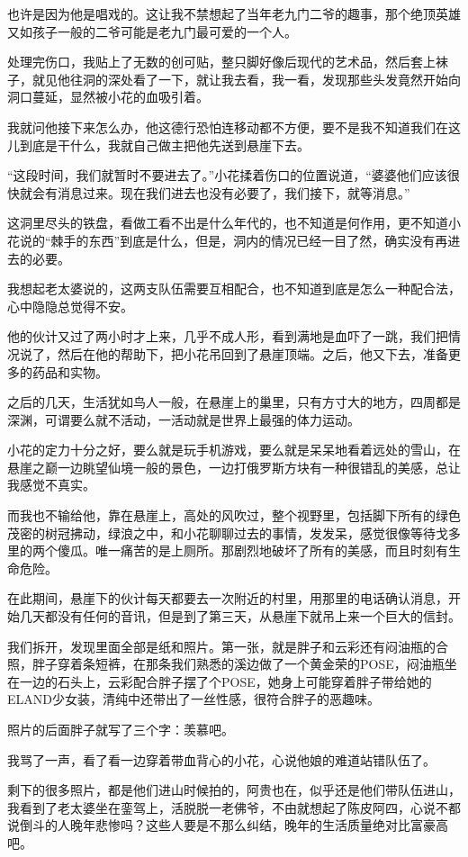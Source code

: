 也许是因为他是唱戏的。这让我不禁想起了当年老九门二爷的趣事，那个绝顶英雄又如孩子一般的二爷可能是老九门最可爱的一个人。

处理完伤口，我贴上了无数的创可贴，整只脚好像后现代的艺术品，然后套上袜子，就见他往洞的深处看了一下，就让我去看，我一看，发现那些头发竟然开始向洞口蔓延，显然被小花的血吸引着。

我就问他接下来怎么办，他这德行恐怕连移动都不方便，要不是我不知道我们在这儿到底是干什么，我就自己做主把他先送到悬崖下去。

“这段时间，我们就暂时不要进去了。”小花揉着伤口的位置说道，“婆婆他们应该很快就会有消息过来。现在我们进去也没有必要了，我们接下，就等消息。”

这洞里尽头的铁盘，看做工看不出是什么年代的，也不知道是何作用，更不知道小花说的“棘手的东西”到底是什么，但是，洞内的情况已经一目了然，确实没有再进去的必要。

我想起老太婆说的，这两支队伍需要互相配合，也不知道到底是怎么一种配合法，心中隐隐总觉得不安。

他的伙计又过了两小时才上来，几乎不成人形，看到满地是血吓了一跳，我们把情况说了，然后在他的帮助下，把小花吊回到了悬崖顶端。之后，他又下去，准备更多的药品和实物。

之后的几天，生活犹如鸟人一般，在悬崖上的巢里，只有方寸大的地方，四周都是深渊，可谓要么就不活动，一活动就是世界上最强的体力运动。

小花的定力十分之好，要么就是玩手机游戏，要么就是呆呆地看着远处的雪山，在悬崖之巅一边眺望仙境一般的景色，一边打俄罗斯方块有一种很错乱的美感，总让我感觉不真实。

而我也不输给他，靠在悬崖上，高处的风吹过，整个视野里，包括脚下所有的绿色茂密的树冠拂动，绿浪之中，和小花聊聊过去的事情，发发呆，感觉很像等待戈多里的两个傻瓜。唯一痛苦的是上厕所。那剧烈地破坏了所有的美感，而且时刻有生命危险。

在此期间，悬崖下的伙计每天都要去一次附近的村里，用那里的电话确认消息，开始几天都没有任何的音讯，但是到了第三天，从悬崖下就吊上来一个巨大的信封。

我们拆开，发现里面全部是纸和照片。第一张，就是胖子和云彩还有闷油瓶的合照，胖子穿着条短裤，在那条我们熟悉的溪边做了一个黄金荣的POSE，闷油瓶坐在一边的石头上，云彩配合胖子摆了个POSE，她身上可能穿着胖子带给她的ELAND少女装，清纯中还带出了一丝性感，很符合胖子的恶趣味。

照片的后面胖子就写了三个字：羡慕吧。

我骂了一声，看了看一边穿着带血背心的小花，心说他娘的难道站错队伍了。

剩下的很多照片，都是他们进山时候拍的，阿贵也在，似乎还是他们带队伍进山，我看到了老太婆坐在銮驾上，活脱脱一老佛爷，不由就想起了陈皮阿四，心说不都说倒斗的人晚年悲惨吗？这些人要是不那么纠结，晚年的生活质量绝对比富豪高吧。

